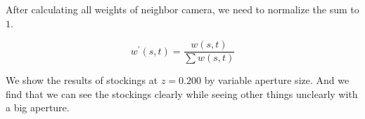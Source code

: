 \documentclass[acmtog]{acmart}
\begin{document}
		\quad After calculating all weights of neighbor camera, we need to normalize the sum to $1$.
		
		\[
		w^\prime(s,t) = \frac{w(s, t)}{\sum w(s,t)}
		\]
		
		\quad We show the results of stockings at $z=0.200$ by variable aperture size. And we find that we can see  the stockings clearly while seeing other things unclearly with a big aperture.
		
		\begin{figure}[htbp]
			\centering
			\quad
			\quad
\end{figure}
\end{document}
